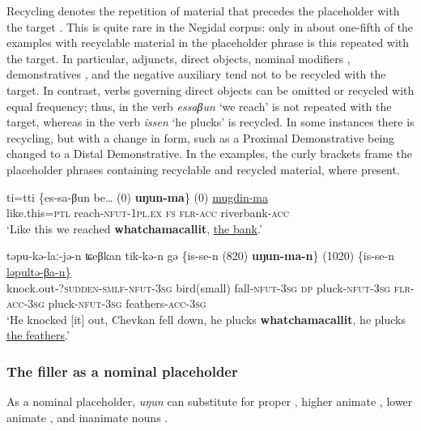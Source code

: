 \documentclass[output=paper]{langscibook}
\begin{document}
Recycling denotes the repetition of material that precedes the placeholder with the target \citep[23--25]{Podlesskaya2010}. This is quite rare in the Negidal corpus: only in about one-fifth of the examples with recyclable material in the placeholder phrase is this repeated with the target. In particular, adjuncts, direct objects, nominal modifiers , demonstratives , and the negative auxiliary  tend not to be recycled with the target. In contrast, verbs governing direct objects can be omitted or recycled with equal frequency; thus, in  the verb \textit{essaβun} ‘we reach’ is not repeated with the target, whereas in  the verb \textit{issen} ‘he plucks’ is recycled. In some instances there is recycling, but with a change in form, such as a Proximal Demonstrative being changed to a Distal Demonstrative. In the examples, the curly brackets frame the placeholder phrases containing recyclable and recycled material, where present.


\ea \label{ex:pakendorf:19}
\gll ti=tti
	\{es-sa-βun
	be…
	\textup{(0)}
	\textbf{uŋun-ma}\}
	\textup{(0)}
	\uline{mugdin-ma}\\
     like.this=\textsc{ptl}
     reach-\textsc{nfut-1pl.ex}
     \textsc{fs}
     {}
     \textsc{flr-acc}
     {}
     riverbank-\textsc{acc}\\
\glt ‘Like this we reached \textbf{whatchamacallit}, \uline{the bank}.’ 
\z


\ea \label{ex:pakendorf:20}
\gll təpu-kə-laː-jə-n
	ʨeβkan
	tik-kə-n
	gə
	\{is-se-n
	\textup{(820)}
	\textbf{uŋun-ma-n}\}
	\textup{(1020)}
	\{is-se-n
	\uline{ləpultə-βa-n\}}\\
     knock.out\textsc{{}-?sudden-smlf-nfut-3sg}
     bird(small)
     fall-\textsc{nfut-3sg}
     \textsc{dp}
     pluck-\textsc{nfut-3sg}
     {}
     \textsc{flr-acc-3sg}
     {}
     pluck-\textsc{nfut-3sg}
     feathers-\textsc{acc-3sg}\\
\glt ‘He knocked [it] out, Chevkan fell down, he plucks \textbf{whatchamacallit}, he plucks \uline{the feathers}.’ 
\z

\subsubsection{The filler as a nominal placeholder}
\label{sec:pakendorf:4.1.4}
As a nominal placeholder, \textit{uŋun} can substitute for proper , higher animate , lower animate , and inanimate nouns . 
\end{document}
